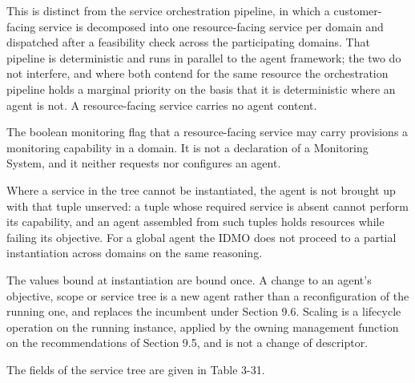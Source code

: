 This is distinct from the service orchestration pipeline, in which a
customer-facing service is decomposed into one resource-facing service
per domain and dispatched after a feasibility check across the
participating domains. That pipeline is deterministic and runs in
parallel to the agent framework; the two do not interfere, and where
both contend for the same resource the orchestration pipeline holds a
marginal priority on the basis that it is deterministic where an agent
is not. A resource-facing service carries no agent content.

The boolean monitoring flag that a resource-facing service may carry
provisions a monitoring capability in a domain. It is not a declaration
of a Monitoring System, and it neither requests nor configures an agent.

Where a service in the tree cannot be instantiated, the agent is not
brought up with that tuple unserved: a tuple whose required service is
absent cannot perform its capability, and an agent assembled from such
tuples holds resources while failing its objective. For a global agent
the IDMO does not proceed to a partial instantiation across domains on
the same reasoning.

The values bound at instantiation are bound once. A change to an agent's
objective, scope or service tree is a new agent rather than a
reconfiguration of the running one, and replaces the incumbent under
Section 9.6. Scaling is a lifecycle operation on the running instance,
applied by the owning management function on the recommendations of
Section 9.5, and is not a change of descriptor.

The fields of the service tree are given in Table 3-31.

